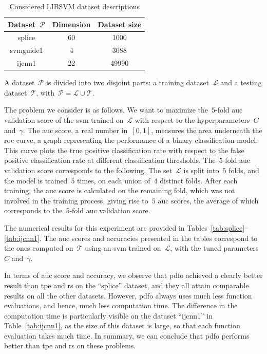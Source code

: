 \documentclass[
    smallextended,  %
    final,        %
]{svjour3}
\begin{document}
\begin{table}[ht]
    \caption{Considered LIBSVM dataset descriptions}
    \label{tab:htdata}
    \centering
    \begin{tabular}{cS[table-format=2]S[table-format=5]}
        \toprule
        Dataset~$\mathcal{P}$   & {Dimension}   & {Dataset size}\\
        \midrule
        splice                  & 60            & 1000\\
        svmguide1               & 4             & 3088\\
        ijcnn1                  & 22            & 49990\\
        \bottomrule
    \end{tabular}
\end{table}

A dataset~$\mathcal{P}$ is divided into two disjoint parts: a training dataset~$\mathcal{L}$ and a testing dataset~$\mathcal{T}$, with~$\mathcal{P} = \mathcal{L} \cup \mathcal{T}$.

The problem we consider is as follows.
We want to maximize the~$5$-fold \gls{auc} validation score of the \gls{svm} trained on~$\mathcal{L}$ with respect to the hyperparameters~$C$ and~$\gamma$.
The \gls{auc} score, a real number in~$[0, 1]$, measures the area underneath the \gls{roc} curve, a graph representing the performance of a binary classification model.
This curve plots the true positive classification rate with respect to the false positive classification rate at different classification thresholds.
The~$5$-fold \gls{auc} validation score corresponds to the following.
The set~$\mathcal{L}$ is split into~$5$ folds, and the model is trained~$5$ times, on each union of~$4$ distinct folds.
After each training, the \gls{auc} score is calculated on the remaining fold, which was not involved in the training process, giving rise to~$5$ \gls{auc} scores, the average of which corresponds to the~$5$-fold \gls{auc} validation score.

The numerical results for this experiment are provided in Tables~\ref{tab:splice}--\ref{tab:ijcnn1}.
The \gls{auc} scores and accuracies presented in the tables correspond to the ones computed on~$\mathcal{T}$ using an \gls{svm} trained on~$\mathcal{L}$, with the tuned parameters~$C$ and~$\gamma$.

In terms of \gls{auc} score and accuracy, we observe that \gls{pdfo} achieved a clearly better result than \gls{tpe} and \gls{rs} on the ``splice'' dataset, and they all attain comparable results on all the other datasets.
However, \gls{pdfo} always uses much less function evaluations, and hence, much less computation time.
The difference in the computation time is particularly visible on the dataset ``ijcnn1'' in Table~\ref{tab:ijcnn1}, as the size of this dataset is large, so that each function evaluation takes much time.
In summary, we can conclude that \gls{pdfo} performs better than \gls{tpe} and \gls{rs} on these problems.
\end{document}
